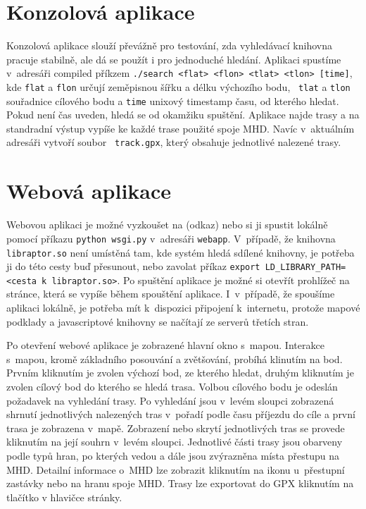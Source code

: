 \section{Konzolová aplikace}
Konzolová aplikace slouží převážně pro testování, zda vyhledávací knihovna
pracuje stabilně, ale dá se použít i pro jednoduché hledání. Aplikaci spustíme
v~adresáři compiled příkzem {\tt ./search <flat> <flon> <tlat> <tlon> [time]},
kde {\tt flat} a {\tt flon} určují zeměpisnou šířku a délku výchozího bodu, {\tt
tlat} a {\tt tlon} souřadnice cílového bodu a {\tt time} unixový timestamp času,
od kterého hledat. Pokud není čas uveden, hledá se od
okamžiku spuštění.  Aplikace najde trasy a na standradní výstup vypíše ke každé
trase použité spoje MHD. Navíc v~aktuálním adresáři vytvoří soubor {\tt
track.gpx}, který obsahuje jednotlivé nalezené trasy.
 
\section{Webová aplikace}
Webovou aplikaci je možné vyzkoušet na (\TODO odkaz) nebo si ji spustit lokálně
pomocí příkazu {\tt python wsgi.py} v~adresáři {\tt webapp}. V~případě, že knihovna
{\tt libraptor.so} není umístěná tam, kde systém hledá sdílené knihovny, je potřeba ji
do této cesty buď přesunout, nebo zavolat příkaz {\tt export
LD\_LIBRARY\_PATH=<cesta k~libraptor.so>}. Po spuštění aplikace je možné si
otevřít prohlížeč na stránce, která se vypíše během spouštění aplikace.
I~v~případě, že spoušíme aplikaci lokálně, je potřeba mít k~dispozici připojení
k~internetu, protože mapové podklady a javascriptové knihovny se načítají ze
serverů třetích stran.

Po otevření webové aplikace je zobrazené hlavní okno s~mapou. Interakce s~mapou,
kromě základního posouvání a zvětšování, probíhá klinutím na bod. Prvním
kliknutím je zvolen výchozí bod, ze kterého hledat, druhým kliknutím je zvolen
cílový bod do kterého se hledá trasa. Volbou cílového bodu je odeslán požadavek
na vyhledání trasy. Po vyhledání jsou v~levém sloupci zobrazená shrnutí
jednotlivých nalezených tras v~pořadí podle času příjezdu do cíle a první trasa
je zobrazena v~mapě. Zobrazení nebo skrytí jednotlivých tras se provede
kliknutím na její souhrn v~levém sloupci. Jednotlivé části trasy jsou obarveny
podle typů hran, po kterých vedou a dále jsou zvýrazněna místa přestupu na MHD.
Detailní informace o~MHD lze zobrazit kliknutím na ikonu u~přestupní zastávky
nebo na hranu spoje MHD. Trasy lze exportovat do GPX kliknutím na tlačítko
 v hlavičce stránky.

